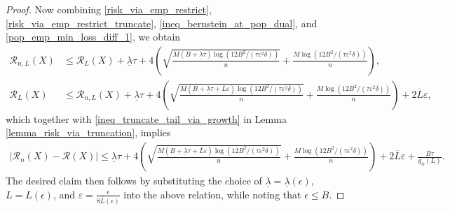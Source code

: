 \documentclass[10pt,a4paper]{amsart}
\newcommand{\abs}[1]{\left\lvert #1 \right\rvert}
\newcommand{\cR}{\mathcal{R}}
\renewcommand{\frac}[2]{\tfrac{#1}{#2}}
\newcommand{\rbr}[1]{\left(#1\right)}
\begin{document}
\begin{proof}
Now combining \eqref{risk_via_emp_restrict}, \eqref{risk_via_emp_restrict_truncate}, \eqref{ineq_bernstein_at_pop_dual}, and \eqref{pop_emp_min_loss_diff_1}, we obtain 
\begin{align*}
\cR_{n,L}(X) & \leq \cR_L(X) + \underline{\lambda} \tau + 4 \rbr{
\sqrt{\frac{ M 
(B + \underline{\lambda} \tau  )
 \log(12B^2/(\tau \varepsilon^2 \delta))}{n}} + \frac{ M \log(12B^2/(\tau \varepsilon^2 \delta))}{n} 
}, \\
\cR_L(X) & \leq \cR_{n,L}(X) + \underline{\lambda} \tau 
+  4 \rbr{
\sqrt{\frac{ M 
(B + \underline{\lambda} \tau + \overline{L} \varepsilon)
 \log(12B^2/(\tau \varepsilon^2 \delta))}{n}} + \frac{ M \log(12B^2/(\tau \varepsilon^2 \delta))}{n} 
}  + 2 \overline{L} \varepsilon,
\end{align*}
which together with \eqref{ineq_truncate_tail_via_growth} in Lemma \ref{lemma_risk_via_truncation}, implies
\begin{align*}
\abs{ \cR_{n} (X) - \cR(X)} 
\leq 
 \underline{\lambda} \tau 
+  4 \rbr{
\sqrt{\frac{ M 
(B + \underline{\lambda} \tau + \overline{L} \varepsilon)
 \log(12B^2/(\tau \varepsilon^2 \delta))}{n}} + \frac{ M \log(12B^2/(\tau \varepsilon^2 \delta))}{n} 
}  + 2 \overline{L} \varepsilon
+ \frac{B\tau}{g_\phi(L)}.
\end{align*}
The desired claim then follows by substituting the choice of 
$\underline{\lambda} = \underline{\lambda}(\epsilon)$,
$L = L(\epsilon)$, and $\varepsilon = \frac{\epsilon}{8 \overline{L}(\epsilon)}$ into the above relation, 
while noting that $\epsilon \leq B$.
\end{proof}
\end{document}
